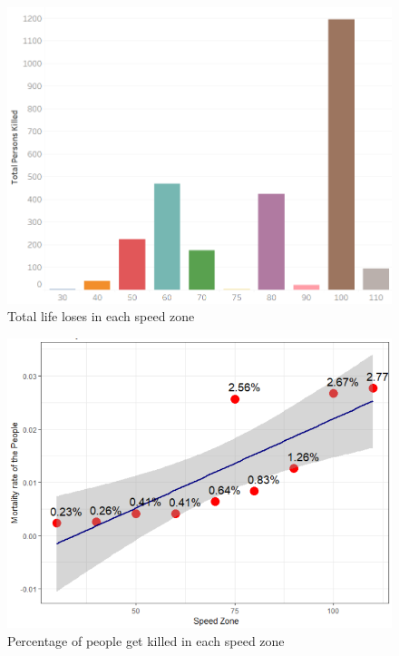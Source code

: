 \documentclass[10pt]{article}
\theoremstyle{definition}
\begin{document}
\begin{minipage}{\linewidth}
  	\centering
  \begin{minipage}{0.45\linewidth}
	\begin{figure}[H]
		\includegraphics[width=\linewidth]{images/speedZone.png}
		\caption{Total life loses in each speed zone}
		\label{fig:speed}
    \end{figure}
  \end{minipage}
  \hspace{0.0\linewidth}
  \begin{minipage}{0.53\linewidth}
     \begin{figure}[H]
            \includegraphics[width=\linewidth]{images/speedKillRateOfPeople.png}
				{\caption{Percentage of people get killed in each speed zone}}
			\label{fig:percentSpeedKills}
    \end{figure}
    \end{minipage}
\end{minipage}\\
\end{document}

